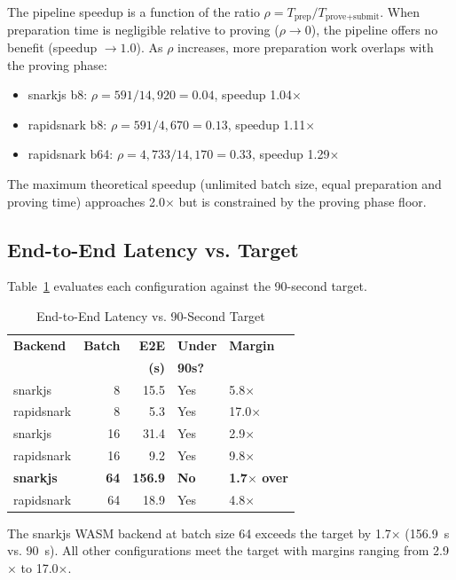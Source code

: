 The pipeline speedup is a function of the ratio $\rho = T_\text{prep} /
T_\text{prove+submit}$. When preparation time is negligible relative to
proving ($\rho \to 0$), the pipeline offers no benefit (speedup $\to 1.0$).
As $\rho$ increases, more preparation work overlaps with the proving phase:

\begin{itemize}
\item snarkjs b8: $\rho = 591 / 14{,}920 = 0.04$, speedup 1.04$\times$
\item rapidsnark b8: $\rho = 591 / 4{,}670 = 0.13$, speedup 1.11$\times$
\item rapidsnark b64: $\rho = 4{,}733 / 14{,}170 = 0.33$, speedup 1.29$\times$
\end{itemize}

The maximum theoretical speedup (unlimited batch size, equal preparation
and proving time) approaches 2.0$\times$ but is constrained by the proving
phase floor.

\subsection{End-to-End Latency vs. Target}

Table~\ref{tab:e2e_target} evaluates each configuration against the
90-second target.

\begin{table}[htbp]
\centering
\caption{End-to-End Latency vs. 90-Second Target}
\label{tab:e2e_target}
\begin{tabular}{lrrll}
\toprule
\textbf{Backend} & \textbf{Batch} & \textbf{E2E} & \textbf{Under} & \textbf{Margin} \\
                  &                & \textbf{(s)} & \textbf{90s?}  & \\
\midrule
snarkjs   & 8  & 15.5  & Yes & 5.8$\times$ \\
rapidsnark & 8  & 5.3   & Yes & 17.0$\times$ \\
snarkjs   & 16 & 31.4  & Yes & 2.9$\times$ \\
rapidsnark & 16 & 9.2   & Yes & 9.8$\times$ \\
\textbf{snarkjs}   & \textbf{64} & \textbf{156.9} & \textbf{No} & \textbf{1.7$\times$ over} \\
rapidsnark & 64 & 18.9  & Yes & 4.8$\times$ \\
\bottomrule
\end{tabular}
\end{table}

The snarkjs WASM backend at batch size 64 exceeds the target by
1.7$\times$ (156.9~s vs. 90~s). All other configurations meet the target
with margins ranging from 2.9$\times$ to 17.0$\times$.

